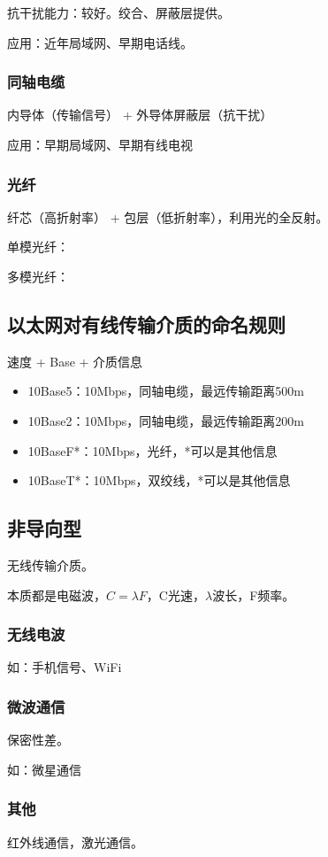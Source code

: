 抗干扰能力：较好。绞合、屏蔽层提供。

应用：近年局域网、早期电话线。


\subsubsection{同轴电缆}
内导体（传输信号） + 外导体屏蔽层（抗干扰）


应用：早期局域网、早期有线电视


\subsubsection{光纤}
纤芯（高折射率） + 包层（低折射率），利用光的全反射。

单模光纤：

多模光纤：


\subsection{以太网对有线传输介质的命名规则}
速度 + Base + 介质信息
\begin{itemize}
    \item 10Base5：10Mbps，同轴电缆，最远传输距离500m
    \item 10Base2：10Mbps，同轴电缆，最远传输距离200m
    \item 10BaseF*：10Mbps，光纤，*可以是其他信息
    \item 10BaseT*：10Mbps，双绞线，*可以是其他信息
\end{itemize}


\subsection{非导向型}
无线传输介质。

本质都是电磁波，\(C = \lambda F\)，C光速，\(\lambda\)波长，F频率。

\subsubsection{无线电波}

如：手机信号、WiFi


\subsubsection{微波通信}
保密性差。

如：微星通信


\subsubsection{其他}
红外线通信，激光通信。

